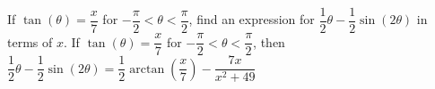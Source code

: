  {If $\tan(\theta) = \dfrac{x}{7}$ for $-\dfrac{\pi}{2} < \theta < \dfrac{\pi}{2}$, find an expression for $\dfrac{1}{2}\theta - \dfrac{1}{2}\sin(2\theta)$ in terms of $x$.}
{ If $\tan(\theta) = \dfrac{x}{7}$ for $-\dfrac{\pi}{2} < \theta < \dfrac{\pi}{2}$, then $\dfrac{1}{2}\theta - \dfrac{1}{2}\sin(2\theta) = \dfrac{1}{2} \arctan \left( \dfrac{x}{7} \right) - \dfrac{7x}{x^{2} + 49}$}
